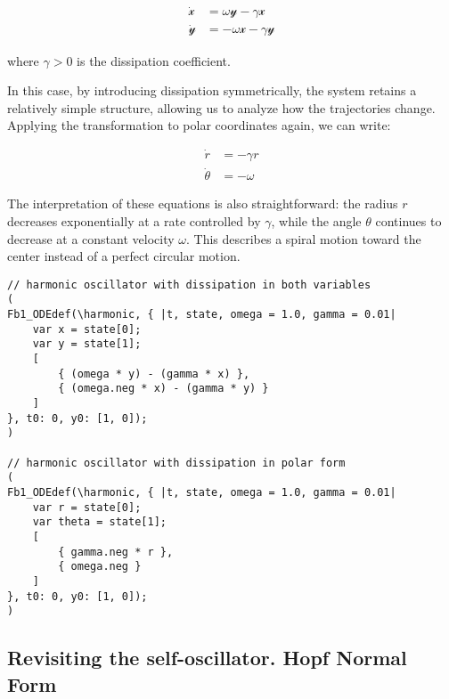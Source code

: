 \documentclass{article}
\begin{document}
\begin{subequations} \label{eq_symosc_diss}
\begin{align}
    \dot{\mathscr{x}} & = \omega\mathscr{y} - \gamma\mathscr{x} \\
    \dot{\mathscr{y}} & = -\omega\mathscr{x} - \gamma\mathscr{y}
\end{align}
\end{subequations}

where $\gamma > 0$ is the dissipation coefficient.

In this case, by introducing dissipation symmetrically, the system retains a relatively simple structure, allowing us to analyze how the trajectories change. Applying the transformation to polar coordinates again, we can write:

\begin{subequations} \label{eq_symosc_diss_polar}
\begin{align}
    \dot{r} & = -\gamma r \\
    \dot{\theta} & = -\omega 
\end{align}
\end{subequations}

The interpretation of these equations is also straightforward: the radius $r$ decreases exponentially at a rate controlled by $\gamma$, while the angle $\theta$ continues to decrease at a constant velocity $\omega$. This describes a spiral motion toward the center instead of a perfect circular motion.


\begin{lstlisting}[caption=The symmetric oscillator and the oscillation on the circle.]
// harmonic oscillator with dissipation in both variables
(
Fb1_ODEdef(\harmonic, { |t, state, omega = 1.0, gamma = 0.01|
	var x = state[0];
	var y = state[1];
	[
		{ (omega * y) - (gamma * x) },
		{ (omega.neg * x) - (gamma * y) }
	]
}, t0: 0, y0: [1, 0]);
)

// harmonic oscillator with dissipation in polar form
(
Fb1_ODEdef(\harmonic, { |t, state, omega = 1.0, gamma = 0.01|
	var r = state[0];
	var theta = state[1];
	[
		{ gamma.neg * r },
		{ omega.neg }
	]
}, t0: 0, y0: [1, 0]);
)

\end{lstlisting}



\subsection{Revisiting the self-oscillator. Hopf Normal Form}
\end{document}
